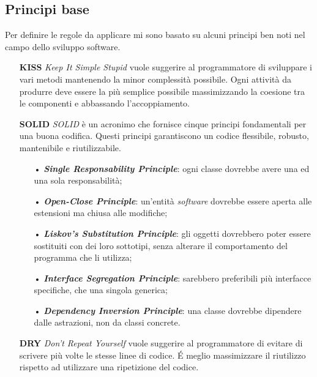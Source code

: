 \subsection{Principi base}
Per definire le regole da applicare mi sono basato su alcuni principi ben noti nel campo dello sviluppo software.

\begin{itemize}
\item[] \textbf{KISS} \textit{Keep It Simple Stupid} vuole suggerire al programmatore di sviluppare i vari metodi mantenendo la minor complessità possibile. Ogni attività da produrre deve essere la più semplice possibile massimizzando la coesione tra le componenti e abbassando l'accoppiamento.

\item[] \textbf{SOLID} \textit{SOLID} è un acronimo che fornisce cinque principi fondamentali per una buona codifica. Questi principi garantiscono un codice flessibile, robusto, mantenibile e riutilizzabile.
\begin{itemize}
\item[•] \textbf{\textit{Single Responsability Principle}}: ogni classe dovrebbe avere una ed una sola responsabilità;

\item[•] \textbf{\textit{Open-Close Principle}}: un'entità \textit{software} dovrebbe essere aperta alle estensioni ma chiusa alle modifiche;

\item[•] \textbf{\textit{Liskov's Substitution Principle}}: gli oggetti dovrebbero poter essere sostituiti con dei loro sottotipi, senza alterare il comportamento del programma che li utilizza;

\item[•] \textbf{\textit{Interface Segregation Principle}}: sarebbero preferibili più interfacce specifiche, che una singola generica;

\item[•] \textbf{\textit{Dependency Inversion Principle}}: una classe dovrebbe dipendere dalle astrazioni, non da classi concrete.
\end{itemize}

\item[] \textbf{DRY} \textit{Don't Repeat Yourself} vuole suggerire al programmatore di evitare di scrivere più volte le stesse linee di codice. É meglio massimizzare il riutilizzo rispetto ad utilizzare una ripetizione del codice.
\end{itemize}

